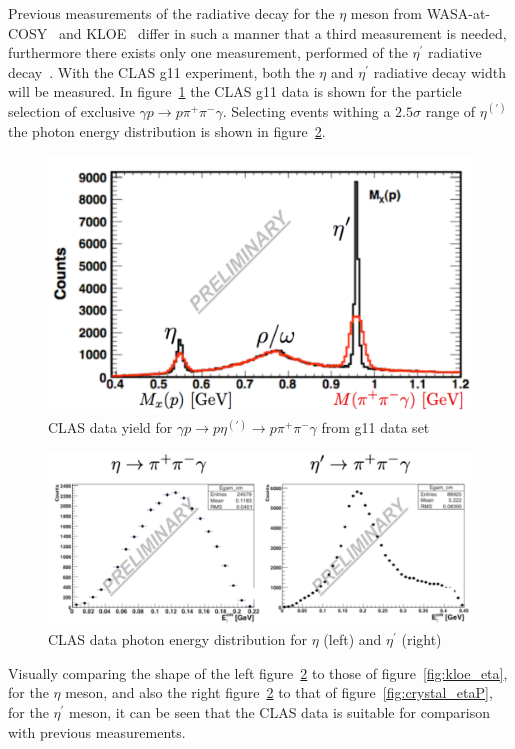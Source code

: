\documentclass{aip-cp}
\begin{document}
Previous measurements of the radiative decay for the $\eta$ meson from WASA-at-COSY~\cite{bib0} and KLOE~\cite{bib1} differ in such a manner that a third measurement is needed, furthermore there exists only one measurement, performed  of the $\eta^{\prime}$ radiative decay~\cite{bib2}. With the CLAS g11 experiment, both the $\eta$ and  $\eta^{\prime}$ radiative decay width will be measured. In figure~\ref{fig:boxCLASdata} the CLAS g11 data is shown for the particle selection of exclusive $\gamma p \to p  \pi^+ \pi^- \gamma $. Selecting events withing a $2.5 \sigma$ range of $\eta^{(\prime)}$ the photon energy distribution is shown in figure~\ref{fig:boxCLAS}. 
\begin{figure}[h]
	\centerline{\includegraphics[width=175 pt]{figures/clas_g11data.pdf}}
	\caption{CLAS data yield for $\gamma p \to p \eta^{(\prime)} \to p \pi^+ \pi^- \gamma $ from g11 data set }
	\label{fig:boxCLASdata}
\end{figure}
\begin{figure}[h]
	\centerline{\includegraphics[width=275 pt]{figures/Box_CLAS.pdf}}
	\caption{CLAS data photon energy distribution for $\eta$ (left) and $\eta^{\prime}$ (right)}
	\label{fig:boxCLAS}
\end{figure}
Visually comparing the shape of the left figure~\ref{fig:boxCLAS} to those of figure~\ref{fig:kloe_eta}, for the  $\eta$ meson, and also the right figure~\ref{fig:boxCLAS} to that of figure~\ref{fig:crystal_etaP}, for the $\eta^{\prime}$ meson, it can be seen that the CLAS data is suitable for comparison with previous measurements.
\end{document}
